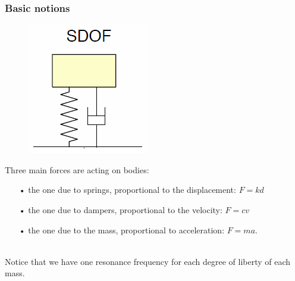 			\subsubsection{Basic notions}
			\begin{figure}
			\vspace{-5mm}
			\includegraphics[scale=0.5]{vibration/ch1/1}
			\end{figure}			
			Three main forces are acting on bodies:
			
			\begin{itemize}
				\item[•] the one due to springs, proportional to the displacement: $F = kd $
				\item[•] the one due to dampers, proportional to the velocity: $F = cv$
				\item[•] the one due to the mass, proportional to acceleration: $F =ma$.
			\end{itemize}
			
			\ \\ Notice that we have one resonance frequency for each degree of liberty of each mass. \newpage
			
